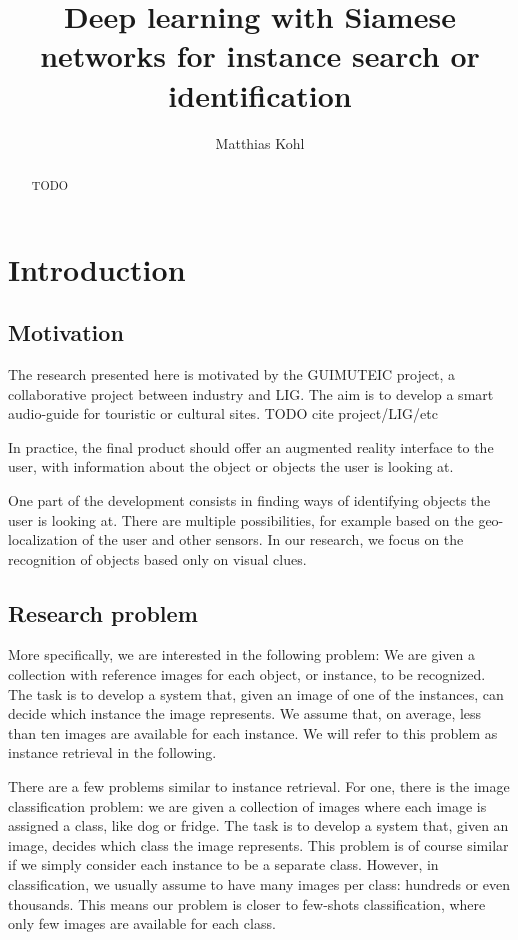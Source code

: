 \documentclass[fleqn]{article}
\title{Deep learning with Siamese networks for instance search or identification}
\author{Matthias Kohl}
\begin{document}
\maketitle

\begin{abstract}
TODO
\end{abstract}

\section{Introduction}
\subsection{Motivation}
The research presented here is motivated by the GUIMUTEIC project,
a collaborative project between industry and LIG. The
aim is to develop a smart audio-guide for touristic or cultural sites.
TODO cite project/LIG/etc

In practice, the final product should offer an augmented reality
interface to the user, with information about the object or objects
the user is looking at.

One part of the development consists in finding ways of identifying
objects the user is looking at. There are multiple possibilities,
for example based on the geo-localization of the user and other sensors.
In our research, we focus on the recognition of objects based
only on visual clues.

\subsection{Research problem}
More specifically, we are interested in the following problem:
We are given a collection with reference images for each object,
or instance, to be recognized. The task is to develop a system that,
given an image of one of the instances, can decide which instance
the image represents. We assume that, on average, less than ten images
are available for each instance.
We will refer to this problem as instance retrieval in the following.

There are a few problems similar to instance retrieval. For one, there is
the image classification problem: we are given a collection of images
where each image is assigned a class, like dog or fridge.
The task is to develop a system that, given an image, decides which
class the image represents.
This problem is of course similar if we simply consider each instance
to be a separate class. However, in classification, we usually
assume to have many images per class: hundreds or even thousands.
This means our problem is closer to few-shots classification, where
only few images are available for each class.
\end{document}
